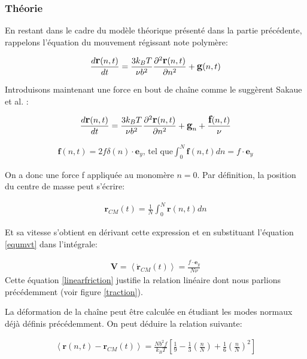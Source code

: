 \subsubsection{Théorie}

En restant dans le cadre du modèle théorique présenté dans la partie précédente, rappelons l'équation du mouvement régissant note polymère:

\begin{eqnarray}
\large{
\frac{d \textbf{r}(n,t)}{dt} =  \frac{3k_BT}{\nu b^2}\frac{\partial ^2 \textbf{r}(n,t)}{\partial  n^2} + \textbf{g}(n,t)}
\end{eqnarray}

Introduisons maintenant une force en bout de chaîne comme le suggèrent Sakaue et al. \cite{Sakaue2012}:

\begin{eqnarray}
\large{
\frac{d \textbf{r}(n,t)}{dt} =  \frac{3k_BT}{\nu b^2}\frac{\partial ^2 \textbf{r}(n,t)}{\partial  n^2} + \textbf{g}_n} + \frac{\textbf{f}(n,t)}{\nu}
\label{equmvt}
\end{eqnarray}

\begin{eqnarray}
\textbf{f}(n,t) = 2f\delta(n)\cdot\textbf{e}_{y} \text{, tel que} \int_{0}^{N} \textbf{f}(n,t) dn = f \cdot \textbf{e}_{y} 
\end{eqnarray}

On a donc une force f appliquée au monomère $n=0$. Par définition, la position du centre de masse peut s'écrire: 

\begin{eqnarray}
\mathbf{r}_{CM}(t) = \frac{1}{N}\int_{0}^{N} \textbf{r}(n,t) dn
\end{eqnarray}

Et sa vitesse s'obtient en dérivant cette expression et en substituant l'équation \ref{equmvt} dans l'intégrale:


\begin{eqnarray}
\textbf{V} = \left<\mathbf{\dot{r}}_{CM}(t)\right> = \frac{f \cdot \textbf{e}_{y}}{N\nu} 
\label{linearfriction}
\end{eqnarray}
Cette équation \ref{linearfriction} justifie la relation linéaire dont nous parlions précédemment (voir figure \ref{traction}).

La déformation de la chaîne peut être calculée en étudiant les modes normaux déjà définis précédemment. On peut déduire la relation suivante:


\begin{eqnarray}
\left<\mathbf{r}(n,t)-\mathbf{r}_{CM}(t)\right> = \frac{Nb^2f}{k_BT}\left[\frac{1}{9}-\frac{1}{3}\left(\frac{n}{N}\right)+\frac{1}{6}\left(\frac{n}{N}\right)^2\right] 
\label{distmonom}
\end{eqnarray}

